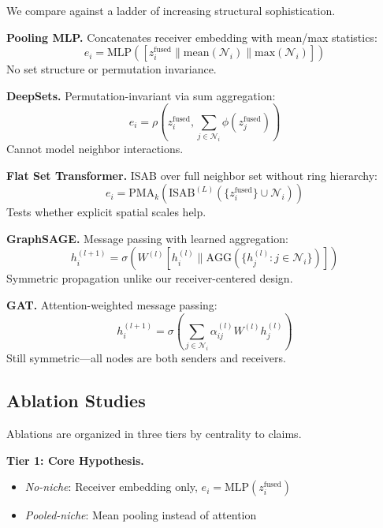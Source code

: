 We compare against a ladder of increasing structural sophistication.

\textbf{Pooling MLP.} Concatenates receiver embedding with mean/max statistics:
\begin{equation}
    e_i = \text{MLP}([z_i^{\text{fused}} \| \text{mean}(\mathcal{N}_i) \| \text{max}(\mathcal{N}_i)])
\end{equation}
No set structure or permutation invariance.

\textbf{DeepSets.} Permutation-invariant via sum aggregation:
\begin{equation}
    e_i = \rho\left(z_i^{\text{fused}}, \sum_{j \in \mathcal{N}_i} \phi(z_j^{\text{fused}})\right)
\end{equation}
Cannot model neighbor interactions.

\textbf{Flat Set Transformer.} ISAB over full neighbor set without ring hierarchy:
\begin{equation}
    e_i = \text{PMA}_k(\text{ISAB}^{(L)}(\{z_i^{\text{fused}}\} \cup \mathcal{N}_i))
\end{equation}
Tests whether explicit spatial scales help.

\textbf{GraphSAGE.} Message passing with learned aggregation:
\begin{equation}
    h_i^{(l+1)} = \sigma\left(W^{(l)} [h_i^{(l)} \| \text{AGG}(\{h_j^{(l)} : j \in \mathcal{N}_i\})]\right)
\end{equation}
Symmetric propagation unlike our receiver-centered design.

\textbf{GAT.} Attention-weighted message passing:
\begin{equation}
    h_i^{(l+1)} = \sigma\left(\sum_{j \in \mathcal{N}_i} \alpha_{ij}^{(l)} W^{(l)} h_j^{(l)}\right)
\end{equation}
Still symmetric—all nodes are both senders and receivers.

\subsection{Ablation Studies}

Ablations are organized in three tiers by centrality to claims.

\textbf{Tier 1: Core Hypothesis.}
\begin{itemize}
    \item \textit{No-niche}: Receiver embedding only, $e_i = \text{MLP}(z_i^{\text{fused}})$
    \item \textit{Pooled-niche}: Mean pooling instead of attention
\end{itemize}

